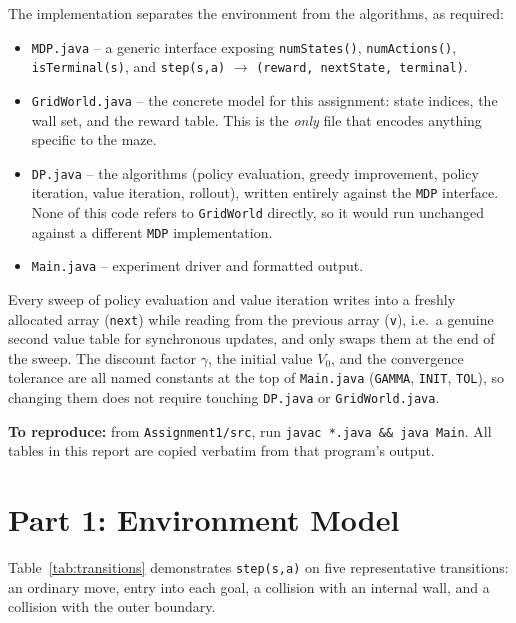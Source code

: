 \documentclass[11pt]{article}
\begin{document}
The implementation separates the environment from the algorithms, as required:
\begin{itemize}
  \item \texttt{MDP.java} -- a generic interface exposing \texttt{numStates()},
  \texttt{numActions()}, \texttt{isTerminal(s)}, and
  \texttt{step(s,a)} $\to$ \texttt{(reward, nextState, terminal)}.
  \item \texttt{GridWorld.java} -- the concrete model for this assignment: state
  indices, the wall set, and the reward table. This is the \emph{only} file
  that encodes anything specific to the maze.
  \item \texttt{DP.java} -- the algorithms (policy evaluation, greedy
  improvement, policy iteration, value iteration, rollout), written entirely
  against the \texttt{MDP} interface. None of this code refers to
  \texttt{GridWorld} directly, so it would run unchanged against a different
  \texttt{MDP} implementation.
  \item \texttt{Main.java} -- experiment driver and formatted output.
\end{itemize}
Every sweep of policy evaluation and value iteration writes into a freshly
allocated array (\texttt{next}) while reading from the previous array
(\texttt{v}), i.e.\ a genuine second value table for synchronous updates, and
only swaps them at the end of the sweep. The discount factor $\gamma$, the
initial value $V_0$, and the convergence tolerance are all named constants at
the top of \texttt{Main.java} (\texttt{GAMMA}, \texttt{INIT}, \texttt{TOL}),
so changing them does not require touching \texttt{DP.java} or
\texttt{GridWorld.java}.

\textbf{To reproduce:} from \texttt{Assignment1/src}, run
\texttt{javac *.java \&\& java Main}. All tables in this report are copied
verbatim from that program's output.

\section{Part 1: Environment Model}

Table~\ref{tab:transitions} demonstrates \texttt{step(s,a)} on five
representative transitions: an ordinary move, entry into each goal, a
collision with an internal wall, and a collision with the outer boundary.
\end{document}

